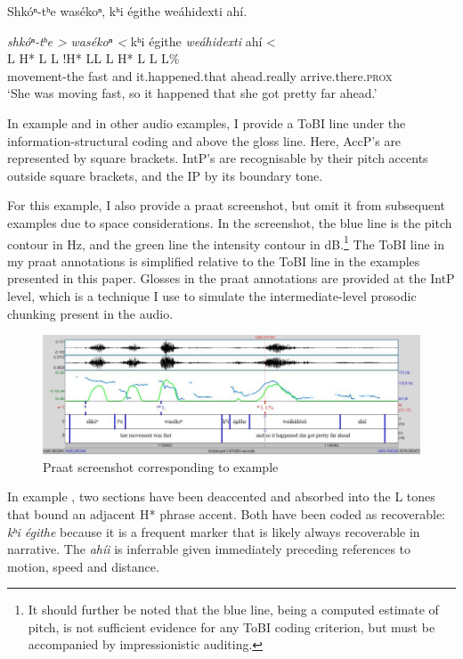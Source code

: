 \documentclass[output=paper]{LSP/langsci}
\begin{document}
\ea\label{wolfedeaccenting}
Shkóⁿ-tʰe wasékoⁿ, kʰi égithe weáhidexti ahí.\footnotemark

\glll 	\emph{shkóⁿ-tʰe >}	\emph{wasékoⁿ <}		kʰi 		égithe 		\emph{weáhidexti}		{ahí <}\\
	{\ob L H* L\cb}		{\ob L !H* L\cb{}L}		{\ob L}	{}			{H* L}				{\cb{}L L\%}\\
	movement-the 		fast 				and 		it.happened.that 	ahead.really	 		arrive.there.\textsc{prox}\\
\glt `She was moving fast, so it happened that she got pretty far ahead.'
\z

In example  and in other audio examples, I provide a ToBI line under the information-structural coding and above the gloss line. Here, AccP’s are represented by square brackets. IntP’s are recognisable by their pitch accents outside square brackets, and the IP by its boundary tone. 

For this example, I also provide a praat \citep{BoersmaWeenink1992} screenshot, but omit it from subsequent examples due to space considerations. In the screenshot, the blue line is the pitch contour in Hz, and the green line the intensity contour in dB.\footnote{It should further be noted that the blue line, being a computed estimate of pitch, is not sufficient evidence for any ToBI coding criterion, but must be accompanied by impressionistic auditing.} The ToBI line in my praat annotations is simplified relative to the ToBI line in the examples presented in this paper. Glosses in the praat annotations are provided at the IntP level, which is a technique I use to simulate the intermediate-level prosodic chunking present in the audio.

\begin{figure}\includegraphics[width=12cm]{figures/Gordon1}\caption{Praat screenshot corresponding to example }\label{wolfedeaccentingscreenshot}\end{figure}

In example , two sections have been deaccented and absorbed into the L tones that bound an adjacent H* phrase accent. Both have been coded as recoverable: \textit{kʰi égithe} because it is a frequent  marker that is likely always recoverable in narrative. The  \textit{ahíi} is inferrable given immediately preceding references to motion, speed and distance.
\end{document}
